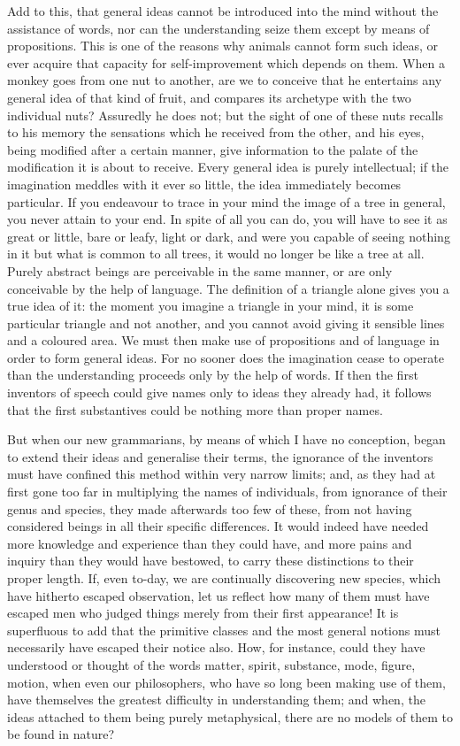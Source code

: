 \documentclass[12pt]{report}
\begin{document}
Add to this, that general ideas cannot be introduced into the mind without the assistance of words, nor can the understanding seize them except by means of propositions. This is one of the reasons why animals cannot form such ideas, or ever acquire that capacity for self-improvement which depends on them. When a monkey goes from one nut to another, are we to conceive that he entertains any general idea of that kind of fruit, and compares its archetype with the two individual nuts? Assuredly he does not; but the sight of one of these nuts recalls to his memory the sensations which he received from the other, and his eyes, being modified after a certain manner, give information to the palate of the modification it is about to receive. Every general idea is purely intellectual; if the imagination meddles with it ever so little, the idea immediately becomes particular. If you endeavour to trace in your mind the image of a tree in general, you never attain to your end. In spite of all you can do, you will have to see it as great or little, bare or leafy, light or dark, and were you capable of seeing nothing in it but what is common to all trees, it would no longer be like a tree at all. Purely abstract beings are perceivable in the same manner, or are only conceivable by the help of language. The definition of a triangle alone gives you a true idea of it: the moment you imagine a triangle in your mind, it is some particular triangle and not another, and you cannot avoid giving it sensible lines and a coloured area. We must then make use of propositions and of language in order to form general ideas. For no sooner does the imagination cease to operate than the understanding proceeds only by the help of words. If then the first inventors of speech could give names only to ideas they already had, it follows that the first substantives could be nothing more than proper names.

But when our new grammarians, by means of which I have no conception, began to extend their ideas and generalise their terms, the ignorance of the inventors must have confined this method within very narrow limits; and, as they had at first gone too far in multiplying the names of individuals, from ignorance of their genus and species, they made afterwards too few of these, from not having considered beings in all their specific differences. It would indeed have needed more knowledge and experience than they could have, and more pains and inquiry than they would have bestowed, to carry these distinctions to their proper length. If, even to-day, we are continually discovering new species, which have hitherto escaped observation, let us reflect how many of them must have escaped men who judged things merely from their first appearance! It is superfluous to add that the primitive classes and the most general notions must necessarily have escaped their notice also. How, for instance, could they have understood or thought of the words matter, spirit, substance, mode, figure, motion, when even our philosophers, who have so long been making use of them, have themselves the greatest difficulty in understanding them; and when, the ideas attached to them being purely metaphysical, there are no models of them to be found in nature?
\end{document}
